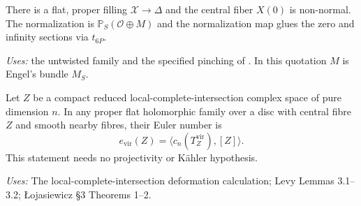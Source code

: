 \begin{refuted}\label{e26:Conjecture8.2}
There is a flat, proper filling $\mathcal X\to \Delta$ and the central fiber $X(0)$ is non-normal. The normalization
is $\mathbb P_S(\mathcal O\oplus M)$ and the normalization map glues the zero and infinity sections via $t_{6P}$.
\end{refuted}
\noindent\emph{Uses:} the untwisted family and the specified pinching of \cite[Conjecture~8.2]{E26}. In this quotation $M$ is Engel's bundle $M_S$.\par
\begin{lemma}[PUSH A.3.1; T]\label{push:A.3.1}
Let $Z$ be a compact reduced local-complete-intersection complex
space of pure dimension $n$. In any proper flat holomorphic
family over a disc with central fibre $Z$ and smooth nearby
fibres, their Euler number is
\[
 e_{\mathrm{vir}}(Z)=\langle c_n(T_Z^{\mathrm{vir}}),[Z]\rangle.
\]
This statement needs no projectivity or K\"ahler hypothesis.
\end{lemma}
\noindent\emph{Uses:} The local-complete-intersection deformation calculation; Levy Lemmas 3.1--3.2; \L{}ojasiewicz \S3 Theorems 1--2.\par

